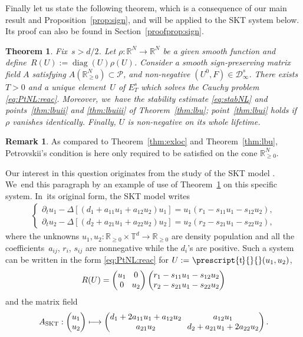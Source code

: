 \documentclass[JEP,XML,SOM,Unicode,published]{cedram}
\newcommand\mto{\mathchoice{\longmapsto}{\mapsto}{\mapsto}{\mapsto}}
\DeclareMathOperator{\diag}{diag}
\newcommand{\SKT}{\textup{SKT}}
\newtheorem{thm}{Theorem}
\theoremstyle{definition}
\newtheorem{rem}[prop]{Remark}
\newcommand\R{\mathbb{R}}
\newcommand\T{\mathbb{T}}
\newcommand*{\transp}[2][-2mu]{\ensuremath{\mskip1mu\prescript{\smash{\mathrm t\mkern#1}}{}{\mathstrut#2}}}%
\begin{document}
Finally let us state the following theorem, which is a consequence of our main result and Proposition~\ref{prop:sign}, and will be applied to the SKT system below. Its proof can also be found in Section~\ref{proofprop:sign}.
\begin{thm}\label{thm:SKT}
Fix~$s>d/2$. Let $\rho:\R^N\to\R^N$ be a given smooth function and define~$R(U):=\diag(U)\rho(U)$. Consider a smooth sign-preserving matrix field $A$ satisfying $A(\R_{\geq 0}^N)\subset \mathscr{P}$, and non-negative $(U^0,F)\in\mathcal{D}_\infty^s$. There exists $T>0$ and a unique element~$U$ of $E_T^s$ which solves the Cauchy problem \eqref{eq:PtNL:reac}. Moreover, we~have the stability estimate \eqref{eq:stabNL} and points~\eqref{thm:lbuii} and \eqref{thm:lbuiii} of Theorem~\ref{thm:lbu}; point~\eqref{thm:lbui} holds if~$\rho$ vanishes identically. Finally, $U$ is non-negative on its whole lifetime.
\end{thm}
\begin{rem}
As compared to Theorem~\ref{thm:exloc} and Theorem~\ref{thm:lbu}, Petrovskii's condition is here only required to be satisfied on the cone $\R^N_{\geq 0}$.
\end{rem}
Our interest in this question originates from the study of the SKT model \cite{skt}. We~end this paragraph by an example of use of Theorem~\ref{thm:SKT}
on this specific system. In~its original form, the SKT model writes
\begin{align}
\label{eq:SKT}
\left\{
\begin{aligned}
\partial_t u_1- \Delta[(d_1+a_{11}u_1+a_{12}u_2)u_1] = u_1(r_1-s_{11}u_1-s_{12}u_2),\\
\partial_t u_2- \Delta[(d_2+a_{21}u_1+a_{22}u_2)u_2] = u_2(r_2-s_{21}u_1-s_{22}u_2),
\end{aligned}
\right.
\end{align}
where the unknowns $u_1,u_2:\R_{\geq 0}\times\T^d\to\R_{\geq 0}$ are density population and all the coefficients~$a_{ij}$, $r_i$, $s_{ij}$ are nonnegative while the $d_i$'s are positive. Such a system can be written in the form \eqref{eq:PtNL:reac} for $U:=\transp{}{(u_1,u_2)}$,
\[\arraycolsep3.5pt
R(U) =
\begin{pmatrix}
u_1 & 0 \\
0 & u_2
\end{pmatrix}\begin{pmatrix}
r_1-s_{11}u_1-s_{12}u_2\\
r_2-s_{21}u_1-s_{22}u_2
\end{pmatrix}
\]
and the matrix field
\begin{align}\label{def:ASKT}\arraycolsep3.5pt
A_{\SKT}:\begin{pmatrix} u_1\\u_2\end{pmatrix} \mto
\begin{pmatrix} d_1+2a_{11}u_1+a_{12}u_2 & a_{12}u_1\\
a_{21}u_2 & d_2+ a_{21}u_1+2 a_{22}u_2
\end{pmatrix}.
\end{align}
\end{document}
